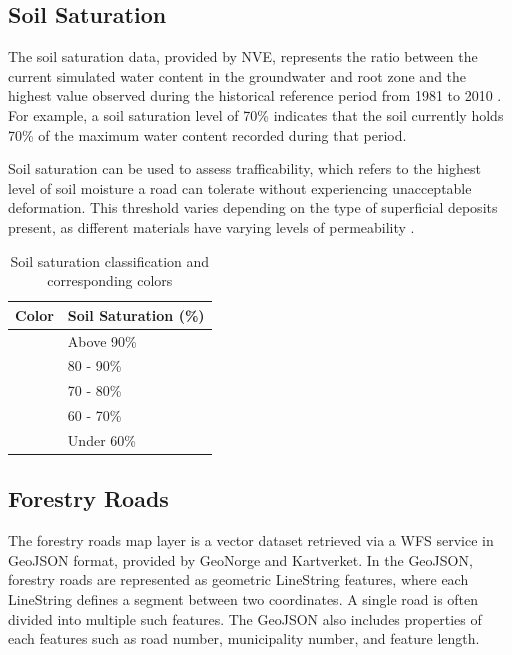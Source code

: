 \subsection{Soil Saturation}

The soil saturation data, provided by NVE, represents the ratio between the current simulated water content in the groundwater and root zone and the highest value observed during the historical reference period from 1981 to 2010 \cite{nve2025waterdata}. For example, a soil saturation level of 70\% indicates that the soil currently holds 70\% of the maximum water content recorded during that period.

Soil saturation can be used to assess \gls{trafficability}, which refers to the highest level of soil moisture a road can tolerate without experiencing unacceptable deformation. This threshold varies depending on the type of superficial deposits present, as different materials have varying levels of permeability \cite{fjeld2023trafficability}.

\begin{table}[h]
    \centering
    \begin{tabular}{|l|l|}
        \hline  
        \textbf{Color} & \textbf{Soil Saturation (\%)} \\
        \hline
        \cellcolor[HTML]{f82200} & Above 90\% \\
        \hline
        \cellcolor[HTML]{f8c400} & 80 - 90\% \\
        \hline
        \cellcolor[HTML]{f8fc00} & 70 - 80\% \\
        \hline
        \cellcolor[HTML]{29d460} & 60 - 70\% \\
        \hline
        \cellcolor[HTML]{e4e4e4} & Under 60\% \\
        \hline
    \end{tabular}
    \caption{Soil saturation classification and corresponding colors \cite{nve2025waterdata}}
    \label{tab:soil_saturation_classification}
\end{table}

\subsection{Forestry Roads}

The forestry roads map layer is a vector dataset retrieved via a WFS service in GeoJSON format, provided by GeoNorge and Kartverket. In the GeoJSON, forestry roads are represented as geometric LineString features, where each LineString defines a segment between two coordinates. A single road is often divided into multiple such features. The GeoJSON also includes properties of each features such as road number, municipality number, and feature length.

